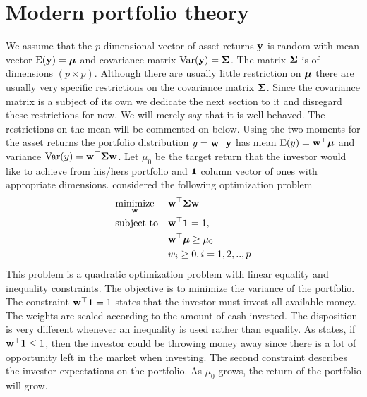 \documentclass[oneside]{book}\usepackage{knitr}
\begin{document}
\chapter[Modern portfolio theory]{Modern portfolio theory}\label{ch:MPT}


We assume that the $p$-dimensional vector of asset returns $\mathbf{y}$ is random with mean vector $\operatorname{E}(\mathbf{y})=\mbox{\boldmath$\mu$}$ and covariance matrix $\operatorname{Var}(\mathbf{y})=\mathbf{\Sigma}$. 
The matrix $\mathbf{\Sigma}$ is of dimensions $(p \times p)$. 
Although there are usually little restriction on $\mbox{\boldmath$\mu$}$ there are usually very specific restrictions on the covariance matrix $\mathbf{\Sigma}$. 
Since the covariance matrix is a subject of its own we dedicate the next section to it and disregard these restrictions for now.
We will merely say that it is well behaved. 
The restrictions on the mean will be commented on below. 
Using the two moments for the asset returns the portfolio distribution $y = \mathbf{w}^\top \mathbf{y}$ has mean $\operatorname{E}(y)=\mathbf{w}^\top \mbox{\boldmath$\mu$}$ and variance $\operatorname{Var}(y)=\mathbf{w}^\top \mathbf{\Sigma} \mathbf{w}$. 
Let $\mu_0$ be the target return that the investor would like to achieve from his/hers portfolio and $\mathbf{1}$ column vector of ones with appropriate dimensions. 
\citet{markowitz1959portfolio} considered the following optimization problem
\begin{equation}\label{eqn:markowitz_optim}
\begin{aligned}
& \underset{\mathbf{w}}{\text{minimize}} 
& & \mathbf{w}^\top \mathbf{\Sigma} \mathbf{w} \\
& \text{subject to}
& & \mathbf{w}^\top \mathbf{1} = 1, \\
& && \mathbf{w}^\top \mbox{\boldmath$\mu$} \geq \mu_0 \\
&&& w_i \geq 0, i=1,2,..,p
\end{aligned}
\end{equation}
This problem is a quadratic optimization problem with linear equality and inequality constraints. 
The objective is to minimize the variance of the portfolio. 
The constraint $\mathbf{w}^\top \mathbf{1} = 1$ states that the investor must invest all available money. 
The weights are scaled according to the amount of cash invested.
The disposition is very different whenever an inequality is used rather than equality. 
As \citet{hult2012risk} states, if $\mathbf{w}^\top \mathbf{1} \leq 1$, then the investor could be throwing money away since there is a lot of opportunity left in the market when investing.
The second constraint describes the investor expectations on the portfolio. 
As $\mu_0$ grows, the return of the portfolio will grow. 
\end{document}
